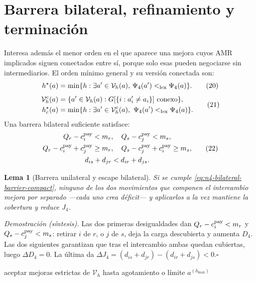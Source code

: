 \documentclass[12pt,a4paper]{article}
\newtheorem{n1lema}{Lema}
\theoremstyle{remark}
\theoremstyle{plain}
\newcommand{\proofsketch}[1]{%
  {\small\textit{Demostración (síntesis).} #1\hfill$\square$\par}
}
\begin{document}
\section{Barrera bilateral, refinamiento y terminación}

Interesa además el menor orden en el que aparece una mejora cuyos AMR implicados
siguen conectados entre sí, porque solo esas pueden negociarse sin intermediarios.
El orden mínimo general y su versión conectada son:
\begin{equation}
h^\star(a)=\min\{h:\exists a'\in\mathcal V_h(a),\,
\Psi_4(a')<_{\rm lex}\Psi_4(a)\}.
\tag{20}
\end{equation}
\begin{equation}
\begin{aligned}
\mathcal V_h^{\rm c}(a)&=\{a'\in\mathcal V_h(a):
G[\{i:a_i'\ne a_i\}]\ {\rm conexo}\},\\
h_c^\star(a)&=\min\{h:\exists a'\in\mathcal V_h^{\rm c}(a),\
\Psi_4(a')<_{\rm lex}\Psi_4(a)\}.
\end{aligned}
\tag{21}
\end{equation}
Una barrera bilateral suficiente satisface:
\begin{equation}
\label{eq:n4-bilateral-barrier-compact}
\begin{gathered}
Q_r-c_i^{\rm pay}<m_r,\quad Q_s-c_j^{\rm pay}<m_s,\\
Q_r-c_i^{\rm pay}+c_j^{\rm pay}\ge m_r,\quad
Q_s-c_j^{\rm pay}+c_i^{\rm pay}\ge m_s,\\
d_{is}+d_{jr}<d_{ir}+d_{js}.
\end{gathered}
\tag{22}
\end{equation}

\begin{n1lema}[Barrera unilateral y escape bilateral]
Si se cumple \eqref{eq:n4-bilateral-barrier-compact}, ninguno de los dos
movimientos que componen el intercambio mejora por separado ---cada uno crea
déficit--- y aplicarlos a la vez mantiene la cobertura y reduce $J_4$.
\end{n1lema}
\proofsketch{Las dos primeras desigualdades dan $Q_r-c_i^{\rm pay}<m_r$ y
$Q_s-c_j^{\rm pay}<m_s$: retirar $i$ de $r$, o $j$ de $s$, deja la carga
descubierta y aumenta $D_4$. Las dos siguientes garantizan que tras el intercambio
ambas quedan cubiertas, luego $\Delta D_4=0$. La última da
$\Delta J_4=(d_{is}+d_{jr})-(d_{ir}+d_{js})<0$.}

\begin{algorithm}[H]
\caption{Refinamiento progresivo por orden de vecindad.}
\label{alg:refinamiento}
\begin{algorithmic}[1]
\State aceptar mejoras estrictas de $\mathcal V_h$ hasta agotamiento o límite
\EndFor
\State \Return $a^{(h_{\max})}$
\end{algorithmic}
\end{algorithm}
\end{document}
